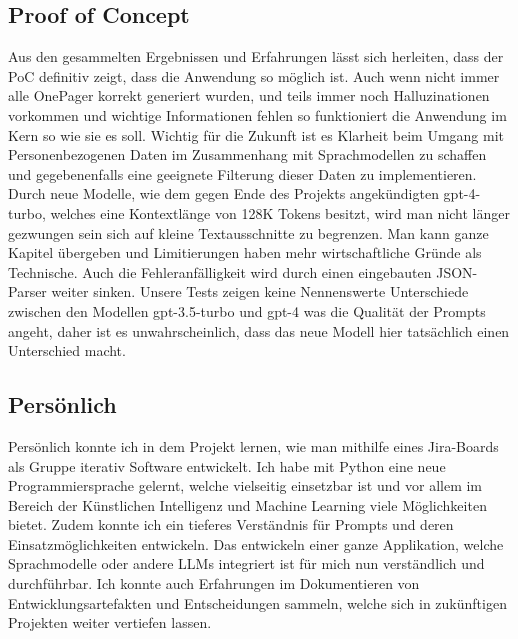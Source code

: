 \subsection{Proof of Concept}
Aus den gesammelten Ergebnissen und Erfahrungen lässt sich herleiten, dass der PoC definitiv zeigt, dass die Anwendung
so möglich ist. Auch wenn nicht immer alle OnePager korrekt generiert wurden, und teils immer noch Halluzinationen
vorkommen und wichtige Informationen fehlen so funktioniert die Anwendung im Kern so wie sie es soll. Wichtig für die
Zukunft ist es Klarheit beim Umgang mit Personenbezogenen Daten im Zusammenhang mit Sprachmodellen zu schaffen und
gegebenenfalls eine geeignete Filterung dieser Daten zu implementieren. Durch neue Modelle, wie dem gegen Ende des
Projekts angekündigten gpt-4-turbo, welches eine Kontextlänge von 128K Tokens besitzt, wird man nicht länger gezwungen
sein sich auf kleine Textausschnitte zu begrenzen. Man kann ganze Kapitel übergeben und Limitierungen haben mehr
wirtschaftliche Gründe als Technische. Auch die Fehleranfälligkeit wird durch einen eingebauten JSON-Parser weiter
sinken. Unsere Tests zeigen keine Nennenswerte Unterschiede zwischen den Modellen gpt-3.5-turbo und gpt-4 was die
Qualität der Prompts angeht, daher ist es unwahrscheinlich, dass das neue Modell hier tatsächlich einen Unterschied
macht.

\subsection{Persönlich}
Persönlich konnte ich in dem Projekt lernen, wie man mithilfe eines Jira-Boards als Gruppe iterativ Software entwickelt.
Ich habe mit Python eine neue Programmiersprache gelernt, welche vielseitig einsetzbar ist und vor allem im Bereich der
Künstlichen Intelligenz und Machine Learning viele Möglichkeiten bietet. Zudem konnte ich ein tieferes Verständnis für
Prompts und deren Einsatzmöglichkeiten entwickeln. Das entwickeln einer ganze Applikation, welche Sprachmodelle oder
andere LLMs integriert ist für mich nun verständlich und durchführbar. Ich konnte auch Erfahrungen im Dokumentieren von
Entwicklungsartefakten und Entscheidungen sammeln, welche sich in zukünftigen Projekten weiter vertiefen lassen. 